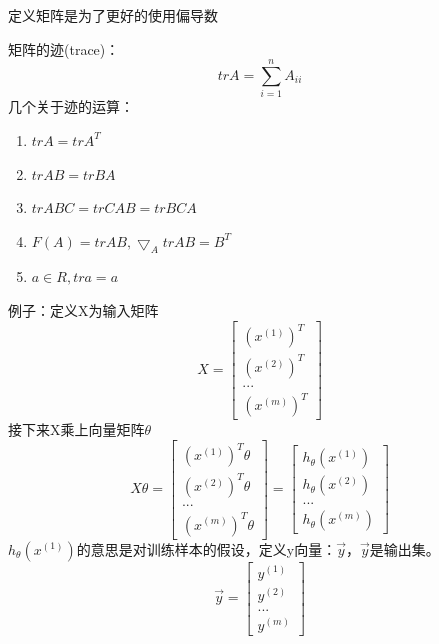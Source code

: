 \documentclass[a4paper,12pt]{ctexbook}
\begin{document}
定义矩阵是为了更好的使用偏导数

矩阵的迹(trace)：
\begin{equation}\label{matix_trace}
tr A={\sum_{i=1}^{n}A_{ii}}
\end{equation}
几个关于迹的运算：
\begin{enumerate}
  \item $tr A = tr A^{T}$
  \item $tr AB = tr BA$
  \item $tr ABC = tr CAB = tr BCA$
  \item $F(A)=tr AB, \bigtriangledown_{A}tr AB = B^{T}$
  \item $a\in R, tr a = a$
\end{enumerate}

例子：定义X为输入矩阵
\begin{equation}
X={
    \left[
        \begin{array}{ccc}
            (x^{(1)})^{T}\\
            (x^{(2)})^{T}\\
            ...\\
            (x^{(m)})^{T}
        \end{array}
    \right ]
}
\end{equation}
接下来X乘上向量矩阵$\theta$
\begin{equation}
X\theta={
    \left[
        \begin{array}{ccc}
            (x^{(1)})^{T}\theta\\
            (x^{(2)})^{T}\theta\\
            ...\\
            (x^{(m)})^{T}\theta
        \end{array}
    \right ]
}={
    \left[
        \begin{array}{ccc}
            h_{\theta}(x^{(1)})\\
            h_{\theta}(x^{(2)})\\
            ...\\
            h_{\theta}(x^{(m)})
        \end{array}
    \right ]
}
\end{equation}
$h_{\theta}(x^{(1)})$的意思是对训练样本的假设，定义y向量：$\overrightarrow{y}$，$\overrightarrow{y}$是输出集。
\begin{equation}
\overrightarrow{y}={
    \left[
        \begin{array}{ccc}
            y^{(1)}\\
            y^{(2)}\\
            ...\\
            y^{(m)}
        \end{array}
    \right ]
}
\end{equation}
\end{document}
